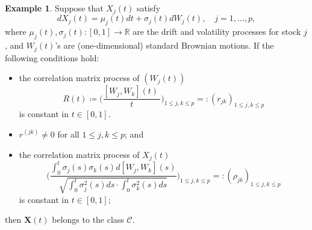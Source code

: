 \documentclass[a4paper,11pt]{book}
\theoremstyle{plain}
\theoremstyle{definition}
\newtheorem{exmp}[thm]{Example}
\newcommand{\MR}{\mathbb{R}}
\begin{document}
    \begin{exmp} \label{exmp C}
    	Suppose that $X_j(t)$ satisfy
    	\[ dX_j(t) = \mu_j(t) dt + \sigma_j(t) dW_j(t), \quad j = 1, \dots, p, \]
    	where $\mu_j(t), \sigma_j(t) : [0, 1] \rightarrow \MR$ are the drift and volatility processes for stock $j$, and $W_j(t)$'s are  (one-dimensional) standard Brownian motions. If the following conditions hold:
    	\begin{itemize}
    		\item the correlation matrix process of $(W_j(t))$
    		\[ R(t)\coloneqq \bigg(\frac{ [W_j, W_k](t) \ }{t}\bigg)_{1 \leq j,k \leq p} =:(r_{jk})_{1 \leq j,k \leq p} \]
    		is constant in $t \in [0, 1]$.
    		\item $r^{(jk)} \neq 0$ for all $1 \leq j,k \leq p$; and
    		\item the correlation matrix process of $X_j(t)$
    		\[ \Bigg( \frac{\int_{0}^{t} \sigma_j(s) \sigma_k(s)  d[W_j, W_k](s) }{\sqrt{\int_{0}^{t} \sigma_j^2(s) ds \cdot \int_{0}^{t} \sigma_k^2(s) ds}} \Bigg)_{1 \leq j,k \leq p}  =:(\rho_{jk})_{1 \leq j,k \leq p}  \]
    		is constant in $t \in [0, 1]$;
    	\end{itemize}
    	then $\mathbf{X}(t)$ belongs to the class $\mathcal{C}$.
    	

\end{exmp}
\end{document}
